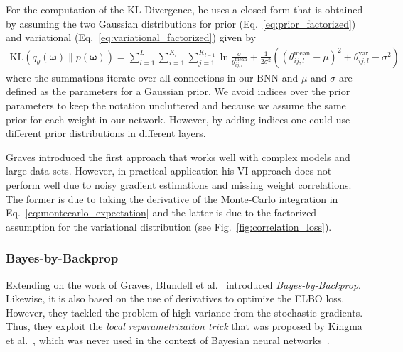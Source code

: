 \documentclass[runningheads]{llncs}
\begin{document}
For the computation of the KL-Divergence, he uses a closed form that is obtained by assuming the two Gaussian distributions for prior (Eq.~\ref{eq:prior_factorized}) and variational (Eq.~\ref{eq:variational_factorized}) given by
\begin{align}
\mathrm{KL}(q_\theta(\boldsymbol{\omega})\|p(\boldsymbol{\omega})) =
\sum_{l=1}^{L}\sum_{i=1}^{K_l}\sum_{j=1}^{K_{l-1}} \ln \frac{\sigma}{\theta^{\mathrm{mean}}_{ij,l}} + \frac{1}{2\sigma^2} \left(( \theta^{\mathrm{mean}}_{ij,l}-\mu )^2 + \theta^{\mathrm{var}}_{ij,l} - \sigma^2\right)
\end{align}
where the summations iterate over all connections in our BNN and $\mu$ and $\sigma$ are defined as the parameters for a Gaussian prior.
We avoid indices over the prior parameters to keep the notation uncluttered and because we assume the same prior for each weight in our network.
However, by adding indices one could use different prior distributions in different layers.

Graves introduced the first approach that works well with complex models and large data sets.
However, in practical application his VI approach does not perform well due to noisy gradient estimations and missing weight correlations.
The former is due to taking the derivative of the Monte-Carlo integration in Eq.~\ref{eq:montecarlo_expectation} and the latter is due to the factorized assumption for the variational distribution (see Fig.~\ref{fig:correlation_loss}).

\subsubsection{Bayes-by-Backprop}
\label{sec:bayes_by_backprop}
Extending on the work of Graves, Blundell et al.~\cite{BlundellBBB} introduced \textit{Bayes-by-Backprop}.
Likewise, it is also based on the use of derivatives to optimize the ELBO loss.
However, they tackled the problem of high variance from the stochastic gradients. 
Thus, they exploit the \textit{local reparametrization trick} that was proposed by Kingma et al.~\cite{Kingma:2015:VDL:2969442.2969527}, which was never used in the context of Bayesian neural networks~\cite{kingma2013autoencoding}.
\end{document}
